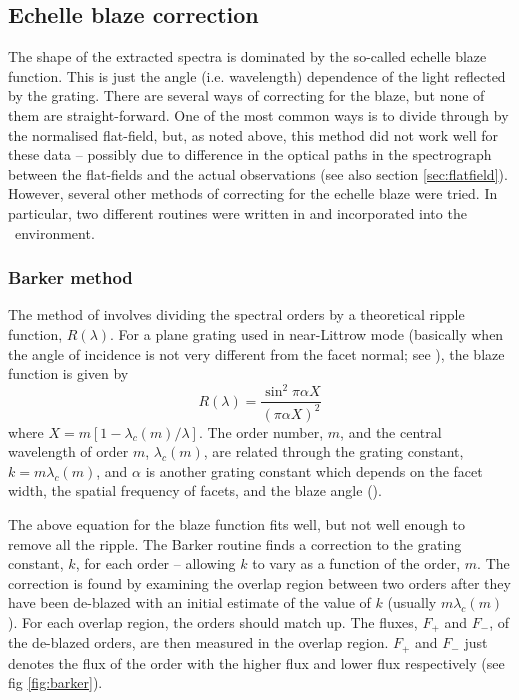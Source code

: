 \subsection{Echelle blaze correction}
\label{sec:blaze}
The shape of the extracted spectra is dominated by the so-called
echelle blaze function. This is just the angle (i.e. wavelength)
dependence of the light reflected by the grating. There are several
ways of correcting for the blaze, but none of them are
straight-forward. One of the most common ways is to divide through by
the normalised flat-field, but, as noted above, this method did not
work well for these data -- possibly due to difference in the optical
paths in the spectrograph between the flat-fields and the actual
observations (see also section
\ref{sec:flatfield}). However, several other methods of correcting for
the echelle blaze were tried. In particular, two different routines
were written in
 and incorporated into the \dipso\ environment.

\subsubsection{Barker method}
\label{sec:barker}
The method of  involves dividing the spectral
orders by a theoretical ripple function, $R(\lambda)$. For a plane
grating used in near-Littrow mode (basically when the angle of
incidence is not very different from the facet normal; see
\cite{gray}), the blaze function is given by
\begin{equation}
R(\lambda) = \frac{\sin^2 \pi\alpha X}{(\pi\alpha X)^2}
\end{equation}
where $X = m[1-\lambda_c(m)/\lambda]$. The order number, $m$, and the
central wavelength of order $m$, $\lambda_c(m)$, are related through
the grating constant, $k = m\lambda_c(m)$, and $\alpha$ is another grating
constant which depends on the facet width, the spatial frequency of
facets, and the blaze angle (\cite{ba:blaze}).

The above equation for the blaze function fits well, but not well
enough to remove all the ripple. The Barker routine finds a correction
to the grating constant, $k$, for each order -- allowing $k$ to vary
as a function of the order, $m$. The correction is found by examining
the overlap region between two orders after they have been de-blazed
with an initial estimate of the value of $k$ (usually
$m\lambda_c(m)$). For each overlap region, the orders should match
up. The fluxes, $F_+$ and $F_-$, of the de-blazed orders, are then
measured in the overlap region. $F_+$ and $F_-$ just denotes the flux
of the order with the higher flux and lower flux respectively (see fig
\ref{fig:barker}).

